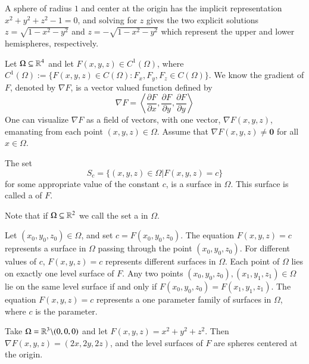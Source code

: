     \begin{example}
        A sphere of radius $1$ and center at the origin has the implicit representation $x^2+y^2+z^2-1=0$, and solving for $z$ gives the two explicit solutions $z = \sqrt{1-x^2-y^2}$ and $z = -\sqrt{1-x^2-y^2}$ which represent the upper and lower hemispheres, respectively.
    \end{example}

    
    Let $\Omega \subseteq \mathbb R^4$ and let $F(x,y,z) \in C^1(\Omega)$, where $C^1(\Omega) := \{F(x,y,z) \in C(\Omega):F_x,F_y,F_z \in C(\Omega)\}$. We know the gradient of $F$, denoted by $\nabla F$, is a vector valued function defined by \begin{equation*}
        \nabla F = \left\langle \frac{\partial F}{\partial x}, \frac{\partial F}{\partial y},\frac{\partial F}{\partial y}\right\rangle
    \end{equation*}
    One can visualize $\nabla F$ as a field of vectors, with one vector, $\nabla F(x,y,z)$, emanating from each point $(x,y,z) \in \Omega$. Assume that $\nabla F(x,y,z) \neq \mathbf{0}$ for all $x \in \Omega$.

    \begin{definition}
        The set \begin{equation*}
            S_c = \{(x,y,z) \in \Omega\vert F(x,y,z) = c\}
        \end{equation*}
        for some appropriate value of the constant $c$, is a surface in $\Omega$. This surface is called a  of $F$.
    \end{definition}

    Note that if $\Omega \subseteq \mathbb R^2$ we call the set a  in $\Omega$.

    Let $(x_0,y_0,z_0) \in \Omega$, and set $c = F(x_0,y_0,z_0)$. The equation $F(x,y,z) = c$ represents a surface in $\Omega$ passing through the point $(x_0,y_0,z_0)$. For different values of $c$, $F(x,y,z) = c$ represents different surfaces in $\Omega$. Each point of $\Omega$ lies on exactly one level surface of $F$. Any two points $(x_0,y_0,z_0),(x_1,y_1,z_1) \in \Omega$ lie on the same level surface if and only if $F(x_0,y_0,z_0) = F(x_1,y_1,z_1)$. The equation $F(x,y,z) = c$ represents a one parameter family of surfaces in $\Omega$, where $c$ is the parameter.

    \begin{example}
        Take $\Omega = \mathbb R^3\backslash (0,0,0)$ and let $F(x,y,z) = x^2+y^2+z^2$. Then $\nabla F(x,y,z) = (2x,2y,2z)$, and the level surfaces of $F$ are spheres centered at the origin.
    \end{example}


